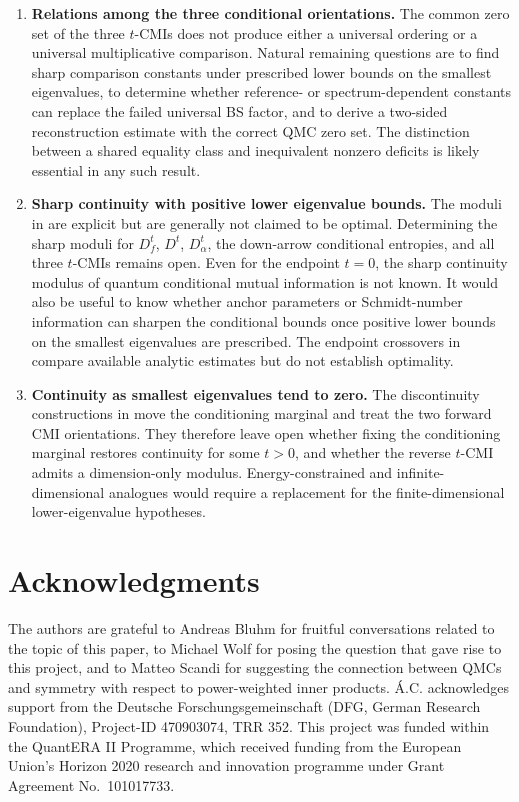 \documentclass[11pt]{article}
\theoremstyle{remark}
\newcommand{\1}{\mathbbm{1}}
\begin{document}
\begin{enumerate}[label=\textbf{\arabic*.},leftmargin=*]
\item \textbf{Relations among the three conditional orientations.}
The common zero set of the three $t$-CMIs does not produce either a
universal ordering or a universal multiplicative comparison.  Natural
remaining questions are to find sharp comparison constants under
prescribed lower bounds on the smallest eigenvalues, to determine
whether reference- or spectrum-dependent constants can replace the
failed universal BS factor, and to derive a two-sided reconstruction
estimate with the correct QMC zero set.  The distinction between a shared equality
class and inequivalent nonzero deficits is likely essential in any
such result.

\item \textbf{Sharp continuity with positive lower eigenvalue bounds.}
The moduli in  are
explicit but are generally not claimed to be optimal.  Determining
the sharp moduli for $D_f^t$, $D^t$, $D_\alpha^t$, the down-arrow
conditional entropies, and all three $t$-CMIs remains open.  Even for
the endpoint $t=0$, the sharp continuity modulus of quantum
conditional mutual information is not known.  It would also be useful
to know whether anchor parameters or Schmidt-number information can
sharpen the conditional bounds once positive lower bounds on the
smallest eigenvalues are prescribed.  The endpoint crossovers in
compare available analytic estimates but do not establish optimality.

\item \textbf{Continuity as smallest eigenvalues tend to zero.}
The discontinuity constructions in
move the conditioning marginal and treat the two forward CMI
orientations.  They therefore leave open whether fixing the
conditioning marginal restores continuity for some $t>0$, and whether
the reverse $t$-CMI admits a dimension-only modulus.  Energy-constrained
and infinite-dimensional analogues would require a replacement for
the finite-dimensional lower-eigenvalue hypotheses.

\end{enumerate}


\section*{Acknowledgments}
The authors are grateful to Andreas Bluhm for fruitful conversations related to the topic of this paper, to Michael Wolf for posing the question that gave rise to this project, and to Matteo Scandi for suggesting the connection between QMCs and symmetry with respect to power-weighted inner products.
 Á.C. acknowledges support from the Deutsche Forschungsgemeinschaft
(DFG, German Research Foundation), Project-ID 470903074, TRR 352.
This project was funded within the QuantERA II Programme, which
received funding from the European Union's Horizon 2020 research and
innovation programme under Grant Agreement No.~101017733.
\end{document}
